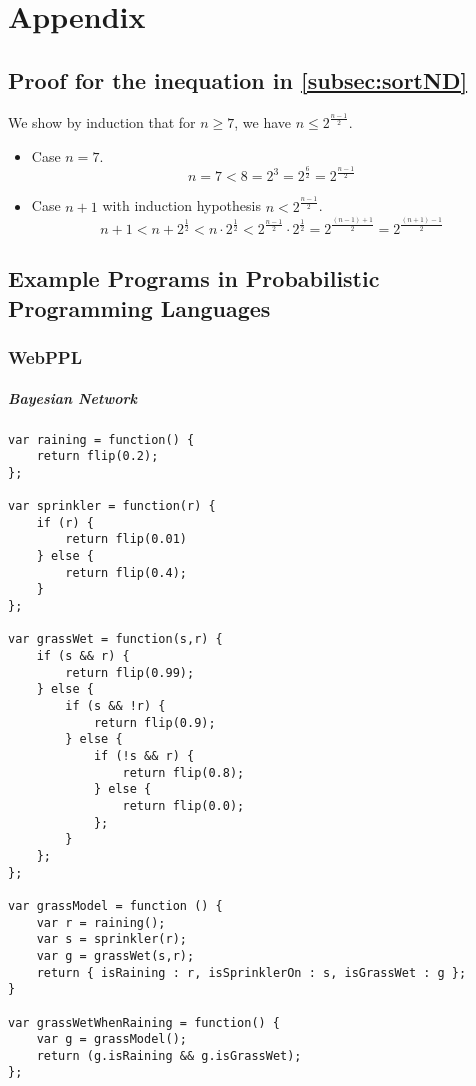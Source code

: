 \chapter{Appendix}
\label{sec:appendix}

\Blindtext[1][1]

\section{Proof for the inequation in \autoref{subsec:sortND}}
\label{sec:appendix:inequation}
We show by induction that for $n \geq 7$, we have $n \leq 2^{\frac{n-1}{2}}$.

\begin{itemize}
\item Case $n=7$.
  \[
    n = 7 < 8 = 2^3 = 2^{\frac{6}{2}}= 2^{\frac{n-1}{2}}
  \]
\item Case $n + 1$ with induction hypothesis $n < 2^{\frac{n-1}{2}}$.
  \[
    n + 1 < n + 2^{\frac{1}{2}} < n \cdot 2^{\frac{1}{2}}< 2^{\frac{n-1}{2}} \cdot 2^{\frac{1}{2}} =  2^{\frac{(n-1) + 1}{2}} = 2^{\frac{(n+1)-1}{2}}
  \]
\end{itemize}

\section{Example Programs in Probabilistic Programming Languages}
\label{sec:appendix:ppl}

\subsection{WebPPL}

\paragraph{Bayesian Network}
\begin{verbatim}
var raining = function() {
    return flip(0.2);
};

var sprinkler = function(r) {
    if (r) {
        return flip(0.01)
    } else {
        return flip(0.4);
    }
};

var grassWet = function(s,r) {
    if (s && r) {
        return flip(0.99);
    } else {
        if (s && !r) {
            return flip(0.9);
        } else {
            if (!s && r) {
                return flip(0.8);
            } else {
                return flip(0.0);
            };
        }
    };
};

var grassModel = function () {
    var r = raining();
    var s = sprinkler(r);
    var g = grassWet(s,r);
    return { isRaining : r, isSprinklerOn : s, isGrassWet : g };
}

var grassWetWhenRaining = function() {
    var g = grassModel();
    return (g.isRaining && g.isGrassWet);
};

\end{verbatim}

